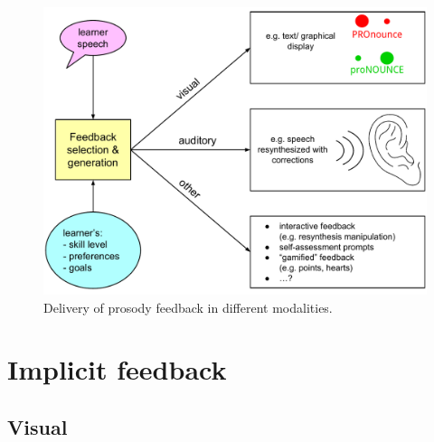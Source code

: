 





	\begin{figure}[htb]
		\includegraphics[width=\textwidth]{img/feedback}
		\caption{Delivery of prosody feedback in different modalities. }
		\label{fig:feedback}
	\end{figure}

%




	\section{Implicit feedback}
	
	
		\subsection{Visual }
		
